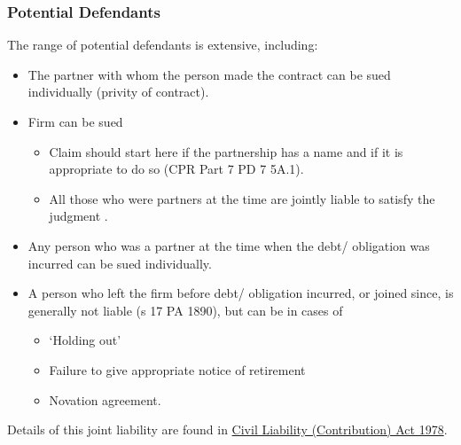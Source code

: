 \documentclass[
]{article}
\providecommand{\tightlist}{%
  \setlength{\itemsep}{0pt}\setlength{\parskip}{0pt}}
\begin{document}
\hypertarget{potential-defendants}{%
\subsubsection{Potential Defendants}\label{potential-defendants}}

The range of potential defendants is extensive, including:

\begin{itemize}
\tightlist
\item
  The partner with whom the person made the contract can be sued
  individually (privity of contract).
\item
  Firm can be sued

  \begin{itemize}
  \tightlist
  \item
    Claim should start here if the partnership has a name and if it is
    appropriate to do so (CPR Part 7 PD 7 5A.1).
  \item
    All those who were partners at the time are jointly liable to
    satisfy the judgment .
  \end{itemize}
\item
  Any person who was a partner at the time when the debt/ obligation was
  incurred can be sued individually.
\item
  A person who left the firm before debt/ obligation incurred, or joined
  since, is generally not liable (s 17 PA 1890), but can be in cases of

  \begin{itemize}
  \tightlist
  \item
    `Holding out'
  \item
    Failure to give appropriate notice of retirement
  \item
    Novation agreement.
  \end{itemize}
\end{itemize}

Details of this joint liability are found in
\href{https://www.legislation.gov.uk/ukpga/1978/47/contents}{Civil
Liability (Contribution) Act 1978}.
\end{document}
